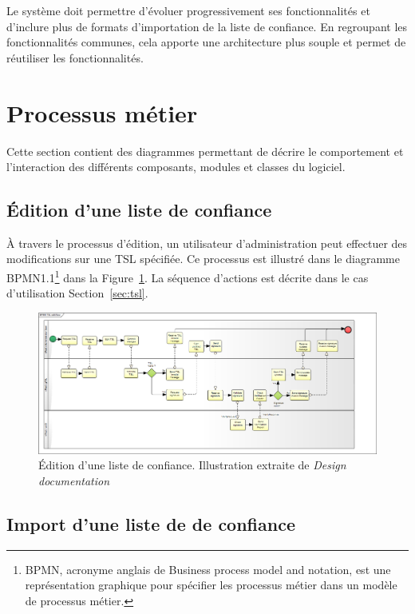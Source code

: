 \documentclass{tnreport}
\begin{document}
Le système doit permettre d'évoluer progressivement ses fonctionnalités et d'inclure plus de formats d'importation de la liste de confiance. En regroupant les fonctionnalités communes, cela apporte une architecture plus souple et permet de réutiliser les fonctionnalités.

\section{Processus métier}

Cette section contient des diagrammes permettant de décrire le comportement et l'interaction des différents composants, modules et classes du logiciel.

\subsection{Édition d'une liste de confiance}

À travers le processus d'édition, un utilisateur d'administration peut effectuer des modifications sur une TSL spécifiée.
Ce processus est illustré dans le diagramme BPMN1.1\footnote{BPMN, acronyme anglais de Business process model and notation, est une représentation graphique pour spécifier les processus métier dans un modèle de processus métier.} dans la Figure~\ref{fig:edit-flow}.
La séquence d'actions est décrite dans le cas d'utilisation Section~\ref{sec:tsl}.

\begin{figure}[h]
	\centering
	\includegraphics[scale=0.3]{figures/edit-flow}
	\caption{Édition d'une liste de confiance. Illustration extraite de \textit{Design documentation}~\cite{design-document}}
	\label{fig:edit-flow}
\end{figure}

\subsection{Import d'une liste de de confiance}
\end{document}
